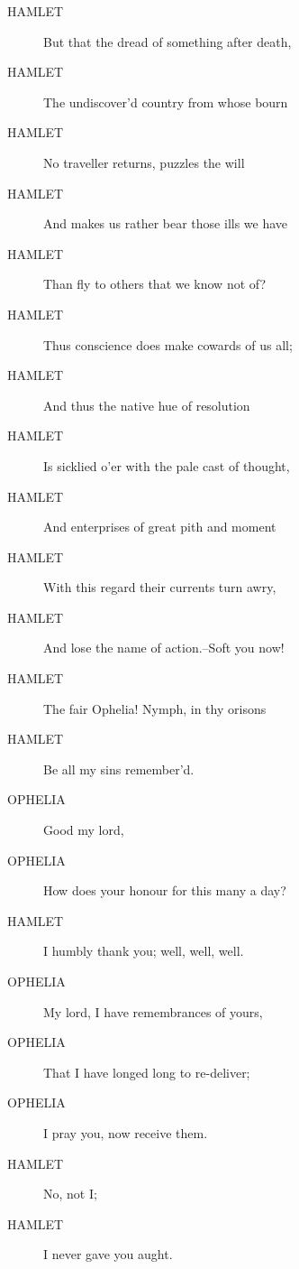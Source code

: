 \documentclass{article}
\begin{document}
\begin{description}
\item[HAMLET] But that the dread of something after death,
\item[HAMLET] The undiscover'd country from whose bourn
\item[HAMLET] No traveller returns, puzzles the will
\item[HAMLET] And makes us rather bear those ills we have
\item[HAMLET] Than fly to others that we know not of?
\item[HAMLET] Thus conscience does make cowards of us all;
\item[HAMLET] And thus the native hue of resolution
\item[HAMLET] Is sicklied o'er with the pale cast of thought,
\item[HAMLET] And enterprises of great pith and moment
\item[HAMLET] With this regard their currents turn awry,
\item[HAMLET] And lose the name of action.--Soft you now!
\item[HAMLET] The fair Ophelia! Nymph, in thy orisons
\item[HAMLET] Be all my sins remember'd.
\end{description}
          
\begin{description}
            
\item[OPHELIA] Good my lord,
\item[OPHELIA] How does your honour for this many a day?
\end{description}
          
\begin{description}
            
\item[HAMLET] I humbly thank you; well, well, well.
\end{description}
          
\begin{description}
            
\item[OPHELIA] My lord, I have remembrances of yours,
\item[OPHELIA] That I have longed long to re-deliver;
\item[OPHELIA] I pray you, now receive them.
\end{description}
          
\begin{description}
            
\item[HAMLET] No, not I;
\item[HAMLET] I never gave you aught.
\end{description}
          
\end{document}
